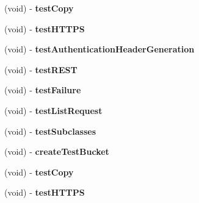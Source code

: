 \begin{DoxyCompactItemize}
\item 
\hypertarget{interface_a_s_i_s3_request_tests_a47ba82f8750aba0ef3928d442442e5c8}{
(void) -\/ {\bfseries test\-Copy}}
\label{interface_a_s_i_s3_request_tests_a47ba82f8750aba0ef3928d442442e5c8}

\item 
\hypertarget{interface_a_s_i_s3_request_tests_ab3c1fecc3be8fa9465a8e7a20de1f49e}{
(void) -\/ {\bfseries test\-H\-T\-T\-P\-S}}
\label{interface_a_s_i_s3_request_tests_ab3c1fecc3be8fa9465a8e7a20de1f49e}

\item 
\hypertarget{interface_a_s_i_s3_request_tests_a60bdada8e76611d7d565dff4b2cfd8a9}{
(void) -\/ {\bfseries test\-Authentication\-Header\-Generation}}
\label{interface_a_s_i_s3_request_tests_a60bdada8e76611d7d565dff4b2cfd8a9}

\item 
\hypertarget{interface_a_s_i_s3_request_tests_a8ca48a7b94614a7026f7b7862b722f89}{
(void) -\/ {\bfseries test\-R\-E\-S\-T}}
\label{interface_a_s_i_s3_request_tests_a8ca48a7b94614a7026f7b7862b722f89}

\item 
\hypertarget{interface_a_s_i_s3_request_tests_a91778029a97f36e77dad559977cdb550}{
(void) -\/ {\bfseries test\-Failure}}
\label{interface_a_s_i_s3_request_tests_a91778029a97f36e77dad559977cdb550}

\item 
\hypertarget{interface_a_s_i_s3_request_tests_adf56486c5a0e74cfdf0711c5fa016fb9}{
(void) -\/ {\bfseries test\-List\-Request}}
\label{interface_a_s_i_s3_request_tests_adf56486c5a0e74cfdf0711c5fa016fb9}

\item 
\hypertarget{interface_a_s_i_s3_request_tests_a7d8d7e21e0b483ca67889868688adb7d}{
(void) -\/ {\bfseries test\-Subclasses}}
\label{interface_a_s_i_s3_request_tests_a7d8d7e21e0b483ca67889868688adb7d}

\item 
\hypertarget{interface_a_s_i_s3_request_tests_a8cc7c1272f528811ee7d8f5e07fb1133}{
(void) -\/ {\bfseries create\-Test\-Bucket}}
\label{interface_a_s_i_s3_request_tests_a8cc7c1272f528811ee7d8f5e07fb1133}

\item 
\hypertarget{interface_a_s_i_s3_request_tests_a47ba82f8750aba0ef3928d442442e5c8}{
(void) -\/ {\bfseries test\-Copy}}
\label{interface_a_s_i_s3_request_tests_a47ba82f8750aba0ef3928d442442e5c8}

\item 
\hypertarget{interface_a_s_i_s3_request_tests_ab3c1fecc3be8fa9465a8e7a20de1f49e}{
(void) -\/ {\bfseries test\-H\-T\-T\-P\-S}}
\label{interface_a_s_i_s3_request_tests_ab3c1fecc3be8fa9465a8e7a20de1f49e}


\end{DoxyCompactItemize}
